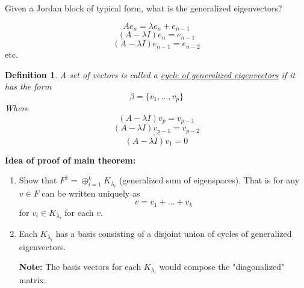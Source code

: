 \documentclass{article}
\newtheorem{definition}[theorem]{Definition}
\newtheorem{one minute paper}[theorem]{One Minute Paper}
\begin{document}
Given a Jordan block of typical form, what is the generalized eigenvectors? 

\begin{equation}
    Ae_{n} = \lambda e_{n} + e_{n-1}
\end{equation}
\begin{equation}
    (A - \lambda I)e_{n} = e_{n-1}
\end{equation}
\begin{equation}
    (A - \lambda I)e_{n-1} = e_{n-2} 
\end{equation}
etc. 
\begin{definition}
    A set of vectors is called a \underline{cycle of generalized eigenvectors} if it has the form
    \begin{equation}
        \beta = \{v_1, \dots, v_p\}
    \end{equation}
    Where 
    \begin{equation}
        (A- \lambda I)v_p = v_{p-1}
    \end{equation}
    \begin{equation}
        (A- \lambda I)v_{p-1} = v_{p-2}
    \end{equation}
    \begin{equation}
        \cdots
    \end{equation}
    \begin{equation}
        (A - \lambda I)v_{1} = 0
    \end{equation}
\end{definition}

\begin{center}
    \textbf{Idea of proof of main theorem:}
\end{center}
\begin{enumerate}
    \item Show that $F^{k} = \oplus_{i=1}^{k}K_{\lambda_i}$ (generalized sum of eigenspaces). That is for any $v \in F$ can be written uniquely as 
    \begin{equation}
        v = v_1 + \dots + v_k    
    \end{equation}
    for $v_i \in K_{\lambda_i}$ for each $v$. 
    \item Each $K_{\lambda_i}$ has a basis consisting of a disjoint union of cycles of generalized eigenvectors. 
    \begin{center}
        \textbf{Note:} The basis vectors for each $K_{\lambda_i}$ would compose the "diagonalized" matrix. 
    \end{center}
\end{enumerate}
\end{document}
